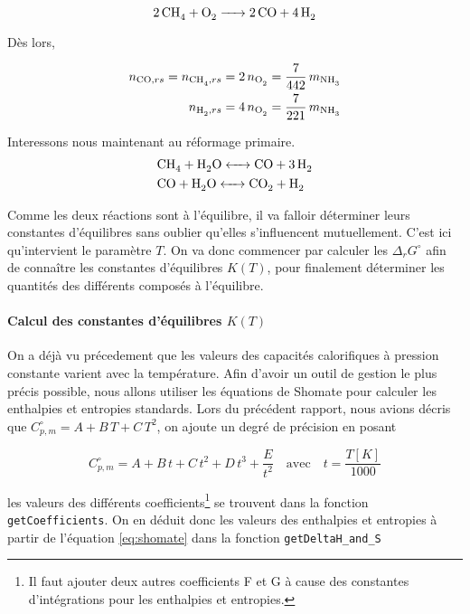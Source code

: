 \documentclass[a4paper, oneside, 12pt]{article}
\begin{document}
\begin{equation*}
	\ce{2CH4 + O2 -> 2CO + 4H2}
\end{equation*}

Dès lors, 

\begin{align}
	n_{\ce{CO}, rs} = n_{\ce{CH4}, rs} 
	= 2 \, n_{\ce{O2}} = \frac{7}{442} \, m_{\ce{NH3}} 
	\label{eq:moles1_ref_sec} \\
	n_{\ce{H2}, rs} = 4 \, n_{\ce{O2}} = \frac{7}{221} \, m_{\ce{NH3}}
	\label{eq:moles2_ref_sec}
\end{align}

Interessons nous maintenant au réformage primaire.
\begin{align*}
	&\ce{CH4 + H2O <-> CO + 3H2} \\
	&\ce{CO + H2O <-> CO2 + H2}
\end{align*}

Comme les deux réactions sont à l'équilibre,
il va falloir déterminer leurs constantes d'équilibres sans
oublier qu'elles s'influencent mutuellement.
C'est ici qu'intervient le paramètre $T$. On va donc commencer
par calculer les $\Delta_r G^{\circ}$ afin de conna\^itre les constantes
d'équilibres $K(T)$, pour finalement déterminer les quantités des différents composés
à l'équilibre.

\paragraph{Calcul des constantes d'équilibres $K(T)$}

On a déjà vu précedement que les valeurs des capacités calorifiques
à pression constante varient avec la température. Afin d'avoir un outil de gestion
le plus précis possible, nous allons utiliser les équations de Shomate pour calculer 
les enthalpies et entropies standards. 
Lors du précédent rapport, nous avions décris que $C_{p,m}^{\circ} = A + B \, T + C \, T^2$,
on ajoute un degré de précision en posant

\begin{equation}
	C_{p,m}^{\circ} = A + B \, t + C \, t^2 + D \, t^3 + \frac{E}{t^2}
	\quad \text{avec} \quad t = \frac{T[K]}{1000}
	\label{eq:shomate}
\end{equation}

les valeurs des différents coefficients\footnote{Il faut ajouter deux autres 
coefficients F et G à cause des constantes d'intégrations pour les
enthalpies et entropies.} 
se trouvent \cite{shomate} dans la fonction \texttt{getCoefficients}.
On en déduit donc les valeurs des enthalpies et entropies
à partir de l'équation \ref{eq:shomate} dans la fonction \texttt{getDeltaH\_and\_S}  
\end{document}
